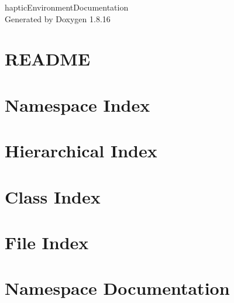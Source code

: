 \let\mypdfximage\pdfximage\def\pdfximage{\immediate\mypdfximage}\documentclass[twoside]{book}
\newcommand{\+}{\discretionary{\mbox{\scriptsize$\hookleftarrow$}}{}{}}
\newcommand{\clearemptydoublepage}{%
  \newpage{\pagestyle{empty}\cleardoublepage}%
}
\begin{document}
\hypersetup{pageanchor=false,
             bookmarksnumbered=true,
             pdfencoding=unicode
            }
\begin{titlepage}
\vspace*{7cm}
\begin{center}%
{\Large haptic\+Environment\+Documentation }\\
\vspace*{1cm}
{\large Generated by Doxygen 1.8.16}\\
\end{center}
\end{titlepage}
\clearemptydoublepage
{}
\tableofcontents
\clearemptydoublepage
{}
\hypersetup{pageanchor=true}

\chapter{R\+E\+A\+D\+ME}
\label{md__home_mfl24__documents_chai_projects_haptic_environment__r_e_a_d_m_e}

\chapter{Namespace Index}

\chapter{Hierarchical Index}

\chapter{Class Index}

\chapter{File Index}

\chapter{Namespace Documentation}

\end{document}
